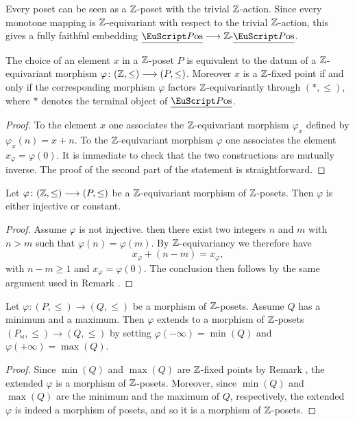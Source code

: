 \begin{remark}
Every poset can be seen as a $\mathbb{Z}$-poset with the trivial $\mathbb{Z}$-action. Since every monotone mapping is $\mathbb{Z}$-equivariant with respect to the trivial $\mathbb{Z}$-action, this gives a fully faithful embedding $\Pos\to \ZPos$.
\end{remark}
\begin{lemma}\label{trivial.but.useful2}
The choice of an element $x$ in a $\mathbb{Z}$-poset $P$ is equivalent to the datum of a $\mathbb{Z}$-equivariant morphism $\varphi\colon(\mathbb{Z} ,\leq)\longrightarrow (P,\leq)$. Moreover $x$ is a $\mathbb{Z}$-fixed point if and only if the corresponding morphism $\varphi$ factors $\mathbb{Z}$-equivariantly through $(*,\leq)$, where $*$ denotes the terminal object of $\Pos$. 
 \end{lemma}
\begin{proof}
To the element $x$ one associates the $\mathbb{Z}$-equivariant morphism $\varphi_x$ defined by $\varphi_x(n)=x+n$. To the $\mathbb{Z}$-equivariant morphism $\varphi$ one associates the element $x_\varphi=\varphi(0)$. It is immediate to check that the two constructions are mutually inverse. The proof of the second part of the statement is straightforward.
\end{proof}
\begin{lemma}
Let $\varphi\colon(\mathbb{Z} ,\leq)\longrightarrow (P,\leq)$ be a $\mathbb{Z}$-equivariant morphism of $\mathbb{Z}$-posets. Then $\varphi$ is either injective or constant.
\end{lemma}
\begin{proof}
Assume $\varphi$ is not injective. then there exist two integers $n$ and $m$ with $n>m$ such that $\varphi(n)=\varphi(m)$. By $\mathbb{Z}$-equivariancy we therefore have
\[
x_\varphi+(n-m)=x_\varphi,
\]
with $n-m\geq 1$ and $x_\varphi=\varphi(0)$. The conclusion then follows by the same argument used in Remark .
\end{proof}
\begin{lemma}\label{extends}
Let $\varphi\colon (P,\leq)\to (Q,\leq)$ be a morphism of $\mathbb{Z}$-posets. Assume $Q$ has a minimum and a maximum. Then $\varphi$ extends to a morphism of $\mathbb{Z}$-posets $(P_{\!\bowtie},\leq)\to (Q,\leq)$ by setting $\varphi(-\infty)=\min(Q)$ and $\varphi(+\infty)=\max(Q)$.
\end{lemma}
\begin{proof}
Since $\min(Q)$ and $\max(Q)$ are $\mathbb{Z}$-fixed points by Remark , the extended $\varphi$ is a morphism of $\mathbb{Z}$-posets. Moreover, since $\min(Q)$ and $\max(Q)$ are the minimum and the maximum of $Q$, respectively, the extended $\varphi$ is indeed a morphism of posets, and so it is a morphism of $\mathbb{Z}$-posets.
\end{proof}

